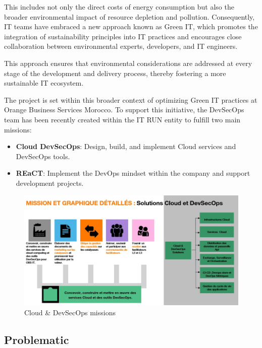 This includes not only the direct costs of energy consumption but also the broader environmental impact of resource depletion and pollution. Consequently, IT teams have embraced a new approach known as Green IT, which promotes the integration of sustainability principles into IT practices and encourages close collaboration between environmental experts, developers, and IT engineers.

This approach ensures that environmental considerations are addressed at every stage of the development and delivery process, thereby fostering a more sustainable IT ecosystem.

The project is set within this broader context of optimizing Green IT practices at Orange Business Services Morocco. To support this initiative, the DevSecOps team has been recently created within the IT RUN entity to fulfill two main missions:

\begin{itemize}
    \item \textbf{Cloud DevSecOps}: Design, build, and implement Cloud services and DevSecOps tools.
    \item \textbf{REaCT}: Implement the DevOps mindset within the company and support development projects.
\end{itemize}

\begin{figure}[H]
  \centering
  \includegraphics[width=17.5cm]{Figures/mission.png}
  \caption{Cloud \& DevSecOps missions}
\end{figure}
\subsection{Problematic}

